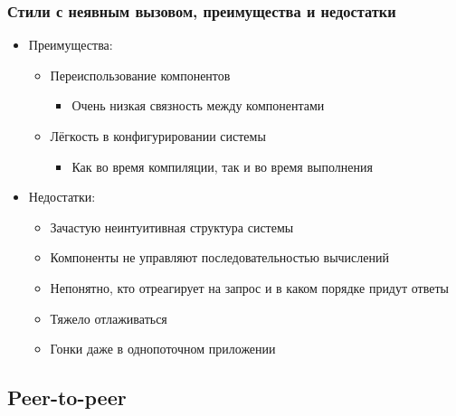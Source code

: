 \documentclass[xetex,mathserif,serif]{beamer}
\begin{document}
    \begin{frame}
        \frametitle{Стили с неявным вызовом, преимущества и недостатки}
        \begin{itemize}
            \item Преимущества:
            \begin{itemize}
                \item Переиспользование компонентов
                \begin{itemize}
                    \item Очень низкая связность между компонентами
                \end{itemize}
                \item Лёгкость в конфигурировании системы
                \begin{itemize}
                    \item Как во время компиляции, так и во время выполнения
                \end{itemize}
            \end{itemize}
            \item Недостатки:
            \begin{itemize}
                \item Зачастую неинтуитивная структура системы
                \item Компоненты не управляют последовательностью вычислений
                \item Непонятно, кто отреагирует на запрос и в каком порядке придут ответы
                \item Тяжело отлаживаться
                \item Гонки даже в однопоточном приложении
            \end{itemize}
        \end{itemize}
    \end{frame}

    \subsection{Peer-to-peer}
\end{document}
